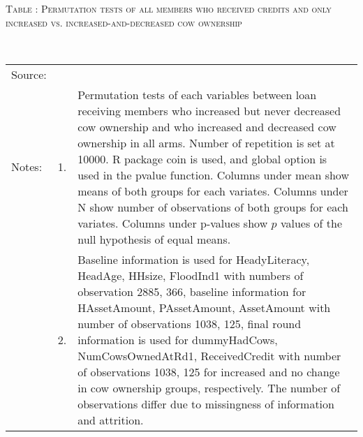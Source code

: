 \hspace{-1cm}\begin{minipage}[t]{14cm}
\hfil\textsc{\normalsize Table \thetable: Permutation tests of all members who received credits and only increased vs. increased-and-decreased cow ownership\label{tab permutation trad cow 3}}\\
\setlength{\tabcolsep}{1pt}
\setlength{\baselineskip}{8pt}
\renewcommand{\arraystretch}{.55}
\hfil{}\\
\renewcommand{\arraystretch}{.8}
\setlength{\tabcolsep}{1pt}
\begin{tabular}{>{\hfill\scriptsize}p{1cm}<{}>{\hfill\scriptsize}p{.25cm}<{}>{\scriptsize}p{12cm}<{\hfill}}
Source:& \multicolumn{2}{l}{\scriptsize Estimated with GUK administrative and survey data.}\\
Notes: & 1. & Permutation tests of each variables between loan receiving members who increased but never decreased cow ownership and who increased and decreased cow ownership in all arms. Number of repetition is set at 10000. \textsf{R} package \textsf{coin} is used, and \textsf{global} option is used in the \textsf{pvalue} function. Columns under \textsf{mean} show means of both groups for each variates. Columns under \textsf{N} show number of observations of both groups for each variates. Columns under \textsf{p-values} show $p$ values of the null hypothesis of equal means. \\
& 2. & Baseline information is used for \textsf{HeadyLiteracy, HeadAge, HHsize, FloodInd1} with numbers of observation 2885, 366, baseline information for \textsf{HAssetAmount, PAssetAmount, AssetAmount} with number of observations 1038, 125, final round information is used for \textsf{dummyHadCows, NumCowsOwnedAtRd1, ReceivedCredit} with number of observations 1038, 125 for increased and no change in cow ownership groups, respectively. The number of observations differ due to missingness of information and attrition.
\end{tabular}
\end{minipage}

